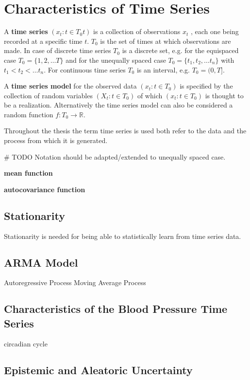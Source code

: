 

\chapter{Characteristics of Time Series}

A \textbf{time series} $(x_t: t \in T_0t)$ is a collection of observations $x_t$ ,
each one being recorded at a specific time $t$. $T_0$ is the set of times at which observations are made.
In case of discrete time series $T_0$ is a discrete set, e.g. for the equispaced case $T_0 = \{1, 2, \dots T\}$ and
for the unequally spaced case $T_0 = \{t_1, t_2, \dots t_n\}$ with $t_1 < t_2 < \dots t_n$.
For continuous time series $T_0$ is an interval, e.g. $T_0 = (0, T]$.

A \textbf{time series model} for the observed data $(x_t: t \in T_0)$ is specified by the collection of random variables
$(X_t: t \in T_0)$ of which $(x_t: t \in T_0)$ is thought to be a realization.
Alternatively the time series model can also be considered a random function $f: T_0 \to \mathbb{R}$.

Throughout the thesis the term time series is used both refer to the data and the process from which it is generated.

\citeauthor{brockwell_introduction_2016}


# TODO Notation should be adapted/extended to unequally spaced case.


\textbf{mean function}

\textbf{autocovariance function}


\section{Stationarity}
Stationarity is needed for being able to statistically learn from time series data.



\section{ARMA Model}

Autoregressive Process
Moving Average Process



\section{Characteristics of the Blood Pressure Time Series}

circadian cycle


\section{Epistemic and Aleatoric Uncertainty}



